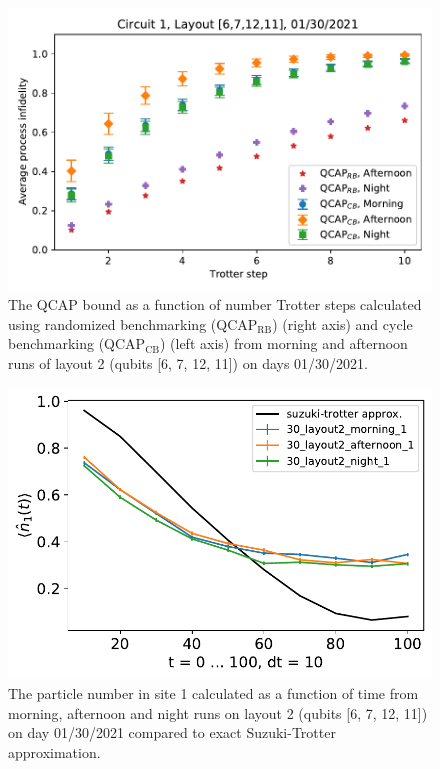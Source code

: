 \begin{figure}[ht!]
    \includegraphics[scale=0.56]{QCAP_CB_RB_Data_01_30_2021_Layout_2C1.pdf}
    \caption{The QCAP bound as a function of number Trotter steps calculated using randomized benchmarking (QCAP$_{\text{RB}}$) (right axis) and cycle benchmarking (QCAP$_{\text{CB}}$) (left axis) from morning and afternoon runs of layout 2 (qubits [6, 7, 12, 11]) on days 01/30/2021.}
    \label{fig:QCAPCB_RB_Story7}
\end{figure}

\begin{figure}[ht!]
    \includegraphics[scale=0.55]{TIM_[30]_[layout2]_[morning, afternoon, night]_n1.pdf}
    \caption{The particle number in site 1 calculated as a function of time from morning, afternoon and night runs on layout 2 (qubits [6, 7, 12, 11]) on day 01/30/2021 compared to exact Suzuki-Trotter approximation.}
    \label{fig:n1_Story7}
\end{figure}




